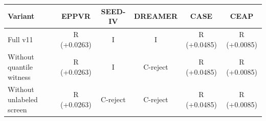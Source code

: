 \begin{tabular}{lccccc}
\toprule
Variant & EPPVR & SEED-IV & DREAMER & CASE & CEAP \\
\midrule
Full v11 & R (+0.0263) & I & I & R (+0.0485) & R (+0.0085) \\
Without quantile witness & R (+0.0263) & I & C-reject & R (+0.0485) & R (+0.0085) \\
Without unlabeled screen & R (+0.0263) & C-reject & C-reject & R (+0.0485) & R (+0.0085) \\
\bottomrule
\end{tabular}

